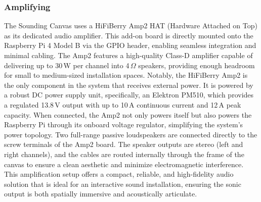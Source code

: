 \documentclass{article}
\begin{document}
\subsubsection{Amplifying}
The Sounding Canvas uses a HiFiBerry Amp2 HAT (Hardware Attached on Top) as its dedicated audio amplifier. This add-on board is directly mounted onto the Raspberry Pi 4 Model B via the GPIO header, enabling seamless integration and minimal cabling. The Amp2 features a high-quality Class-D amplifier capable of delivering up to 30\,W per channel into 4\,$\Omega$ speakers, providing enough headroom for small to medium-sized installation spaces. \newline 
Notably, the HiFiBerry Amp2 is the only component in the system that receives external power. It is powered by a robust DC power supply unit, specifically, an Elektron PM510, which provides a regulated 13.8\,V output with up to 10\,A continuous current and 12\,A peak capacity. When connected, the Amp2 not only powers itself but also powers the Raspberry Pi through its onboard voltage regulator, simplifying the system’s power topology. \newline
Two full-range passive loudspeakers are connected directly to the screw terminals of the Amp2 board. The speaker outputs are stereo (left and right channels), and the cables are routed internally through the frame of the canvas to ensure a clean aesthetic and minimize electromagnetic interference. \newline 
This amplification setup offers a compact, reliable, and high-fidelity audio solution that is ideal for an interactive sound installation, ensuring the sonic output is both spatially immersive and acoustically articulate.
\end{document}
